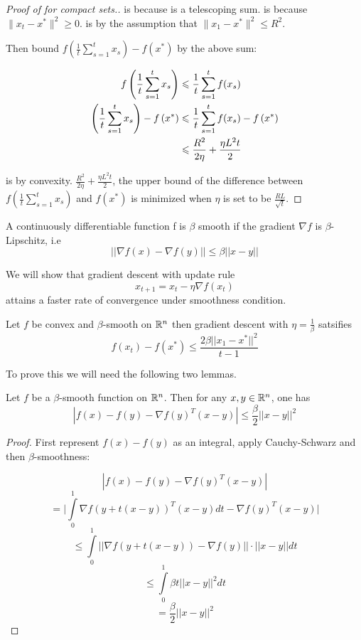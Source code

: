 \begin{proof}[Proof of  for compact sets.]
 is because  is a telescoping sum.
 is because $\lVert x_{t} - x^* \rVert^2 \geq 0$.
 is by the assumption that $\lVert x_1 - x^* \rVert^2 \leq R^2$.

Then bound $f\left(\frac{1}{t}\sum_{s=1}^t x_s\right) - f\left(x^*\right)$ by
the above sum:

\begin{align}
    f\left(\frac{1}{t}\sum_{s=1}^t x_s\right) &\leq \frac{1}{t} \sum_{s=1}^t f(x_s) \equationlabel{k} \\
    \left(\frac{1}{t}\sum_{s=1}^t x_s\right) - f\left(x^*\right) &\leq \frac{1}{t} \sum_{s=1}^t f(x_s) - f\left(x^*\right) \equationlabel{l} \\
    &\leq \frac{R^2}{2\eta} + \frac{\eta L^2 t}{2}
\end{align}

 is by convexity. $\frac{R^2}{2\eta} + \frac{\eta L^2 t}{2}$,
the upper bound of the difference between $f\left(\frac{1}{t}\sum_{s=1}^t
x_s\right)$ and $f\left(x^*\right)$ is minimized when $\eta$ is set to be
$\frac{RL}{\sqrt{t}}$.

\end{proof}

A continuously differentiable function f is $\beta$ smooth if the gradient $\nabla f$ is $\beta$-Lipschitz, i.e
$$||\nabla f(x) - \nabla f(y)|| \leq \beta||x-y||$$

We will show that gradient descent  with update rule
$$x_{t+1} = x_t - \eta \nabla f(x_t)$$
attains a faster rate of convergence under smoothness condition.

\begin{theorem}
Let $f$ be convex and $\beta$-smooth on $\mathbb{R}^n$ then gradient descent with $\eta = \frac{1}{\beta}$ satsifies
$$f(x_t) - f(x^*) \leq \frac{2\beta||x_1 - x^*||^2}{t-1}$$
\end{theorem}
To prove this we will need the following two lemmas.

\begin{lemma}\label{l1}
Let $f$ be a $\beta$-smooth function on $\mathbb{R}^n$.  Then for any $x,y \in \mathbb{R}^n$, one has
$$|f(x) - f(y) - \nabla f(y)^T(x-y)| \leq \frac{\beta}{2}||x-y||^2$$
\end{lemma}

\begin{proof}
First represent $f(x) - f(y)$ as an integral, apply Cauchy-Schwarz and then $\beta$-smoothness:

$$|f(x) - f(y) - \nabla f(y)^T(x-y)|$$
$$= \big|\int\limits_{0}^1 \nabla f(y + t(x-y))^T(x-y)dt - \nabla f(y)^T(x-y)\big|$$
$$\leq  \int\limits_{0}^1 ||\nabla f(y + t(x-y)) - \nabla f(y)||\cdot ||x-y||dt$$
$$\leq \int\limits_{0}^1 \beta t||x-y||^2dt$$
$$= \frac{\beta}{2}||x-y||^2$$
\end{proof}

